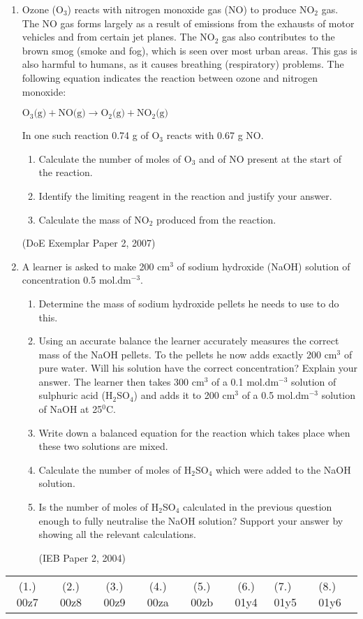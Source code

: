 \begin{eocexercises}{}
\begin{enumerate}
\item{Ozone (O$_{3}$) reacts with nitrogen monoxide gas (NO) to produce NO$_{2}$ gas. The NO gas forms largely as a result of emissions from the exhausts of motor vehicles and from certain jet planes. The NO$_{2}$ gas also contributes to the brown smog (smoke and fog), which is seen over most urban areas. This gas is also harmful to humans, as it causes breathing (respiratory) problems. The following equation indicates the reaction between ozone and nitrogen monoxide:
\begin{center}
$\text{O}_{3}\text{(g)} + \text{NO(g)} \rightarrow \text{O}_{2}\text{(g)} + \text{NO}_{2}\text{(g)}$
\end{center}
In one such reaction 0.74 g of O$_{3}$ reacts with 0.67 g NO.
\begin{enumerate}
\item{Calculate the number of moles of O$_{3}$ and of NO present at the start of the reaction.}
\item{Identify the limiting reagent in the reaction and justify your answer.}
\item{Calculate the mass of NO$_{2}$ produced from the reaction.}
\end{enumerate}
(DoE Exemplar Paper 2, 2007)}
\item{A learner is asked to make 200 cm$^{3}$ of sodium hydroxide (NaOH) solution of concentration 0.5 mol.dm$^{-3}$.
\begin{enumerate}
\item{Determine the mass of sodium hydroxide pellets he needs to use to do this.}
\item{Using an accurate balance the learner accurately measures the correct mass of the NaOH pellets. To the pellets he now adds exactly 200 cm$^{3}$ of pure water. Will his solution have the correct concentration? Explain your answer.
\newline
The learner then takes 300 cm$^{3}$ of a 0.1 mol.dm$^{-3}$ solution of sulphuric acid (H$_{2}$SO$_{4}$) and adds it to 200 cm$^{3}$ of a 0.5 mol.dm$^{-3}$ solution of NaOH at 25$^{0}$C.}
\item{Write down a balanced equation for the reaction which takes place when these two solutions are mixed.}
\item{Calculate the number of moles of H$_{2}$SO$_{4}$ which were added to the NaOH solution.}
\item{Is the number of moles of H$_{2}$SO$_{4}$ calculated in the previous question enough to fully neutralise the NaOH solution? Support your answer by showing all the relevant calculations.}

(IEB Paper 2, 2004)
\end{enumerate}
}
\end{enumerate}

\practiceinfo

\begin{tabular}[h]{cccccc}
(1.) 00z7 & (2.) 00z8 & (3.) 00z9 & (4.) 00za & (5.) 00zb & (6.) 01y4 & (7.) 01y5 & (8.) 01y6 & 
 \end{tabular}
\end{eocexercises}








